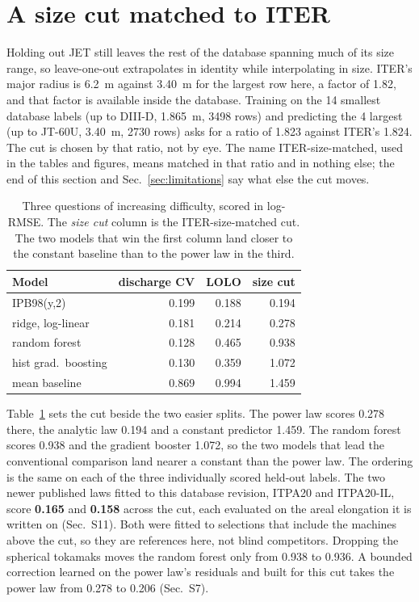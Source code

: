 \documentclass[aip,pop,preprint,amsmath,amssymb]{revtex4-2}
\begin{document}
\section{A size cut matched to ITER}
\label{sec:size}

Holding out JET still leaves the rest of the database spanning much of its
size range, so leave-one-out extrapolates in identity while interpolating in
size. ITER's major radius is \SI{6.2}{\meter} against \SI{3.40}{\meter} for the
largest row here, a factor of 1.82, and that factor is available inside the
database. Training on the 14 smallest database labels (up to DIII-D,
\SI{1.865}{\meter}, 3498 rows) and predicting the 4 largest (up to JT-60U,
\SI{3.40}{\meter}, 2730 rows) asks for a ratio of 1.823 against ITER's 1.824.
The cut is chosen by that ratio, not by eye. The name ITER-size-matched, used
in the tables and figures, means matched in that ratio and in nothing else;
the end of this section and Sec.~\ref{sec:limitations} say what else the cut
moves.

\begin{table}[t]
\caption{Three questions of increasing difficulty, scored in log-RMSE. The
\emph{size cut} column is the ITER-size-matched cut. The two models that win
the first column land closer to the constant baseline than to the power law in
the third.}
\label{tab:escalation}
\begin{ruledtabular}
\begin{tabular}{lrrr}
Model & discharge CV & LOLO & size cut \\
\hline
IPB98(y,2) & 0.199 & 0.188 & 0.194 \\
ridge, log-linear & 0.181 & 0.214 & 0.278 \\
random forest & 0.128 & 0.465 & 0.938 \\
hist grad.\ boosting & 0.130 & 0.359 & 1.072 \\
mean baseline & 0.869 & 0.994 & 1.459 \\
\end{tabular}
\end{ruledtabular}
\end{table}

Table~\ref{tab:escalation} sets the cut beside the two easier splits. The power
law scores 0.278 there, the analytic law 0.194 and a constant predictor 1.459.
The random forest scores 0.938 and the gradient booster 1.072, so the two models
that lead the conventional comparison land nearer a constant than the power law.
The ordering is the same on each of the three individually scored held-out
labels. The two newer published laws fitted to this database revision, ITPA20
and ITPA20-IL\cite{hdb5}, score \textbf{0.165} and \textbf{0.158} across the cut,
each evaluated on the areal elongation it is written on (Sec.~S11). Both were
fitted to selections that include the machines above the cut, so they are
references here, not blind competitors. Dropping the spherical tokamaks moves
the random forest only from 0.938 to 0.936. A bounded correction learned on the
power law's residuals and built for this cut takes the power law from 0.278 to
0.206 (Sec.~S7).
\end{document}
